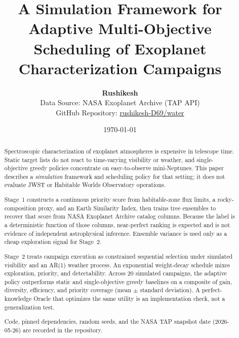\documentclass[11pt,a4paper]{article}
\begin{document}
\title{\textbf{A Simulation Framework for Adaptive Multi-Objective Scheduling of Exoplanet Characterization Campaigns}}

\author{
    \textbf{Rushikesh} \\
    \small Data Source: NASA Exoplanet Archive (TAP API) \\
    \small GitHub Repository: \href{https://github.com/rushikesh-D69/water}{rushikesh-D69/water}
}

\date{\today}

\maketitle

\onehalfspacing

\begin{abstract}
Spectroscopic characterization of exoplanet atmospheres is expensive in telescope time. Static target lists do not react to time-varying visibility or weather, and single-objective greedy policies concentrate on easy-to-observe mini-Neptunes. This paper describes a \emph{simulation} framework and scheduling policy for that setting; it does not evaluate JWST or Habitable Worlds Observatory operations.

Stage~1 constructs a continuous priority score from habitable-zone flux limits, a rocky-composition proxy, and an Earth Similarity Index, then trains tree ensembles to recover that score from NASA Exoplanet Archive catalog columns. Because the label is a deterministic function of those columns, near-perfect ranking is expected and is not evidence of independent astrophysical inference. Ensemble variance is used only as a cheap exploration signal for Stage~2.

Stage~2 treats campaign execution as constrained sequential selection under simulated visibility and an AR(1) weather process. An exponential weight-decay schedule mixes exploration, priority, and detectability. Across 20 simulated campaigns, the adaptive policy outperforms static and single-objective greedy baselines on a composite of gain, diversity, efficiency, and priority coverage (mean $\pm$ standard deviation). A perfect-knowledge Oracle that optimizes the same utility is an implementation check, not a generalization test.

Code, pinned dependencies, random seeds, and the NASA TAP snapshot date (2026-05-26) are recorded in the repository.
\end{abstract}
\end{document}
